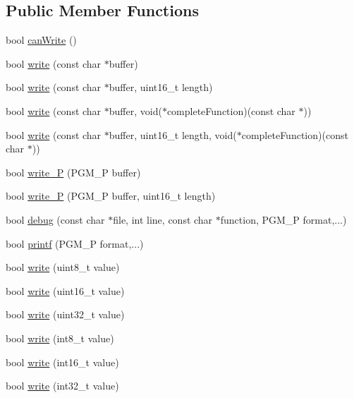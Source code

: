 \subsection*{\-Public \-Member \-Functions}
\begin{DoxyCompactItemize}
\item 
bool \hyperlink{class_m_h_v___device___t_x_a8fe33d10a27066c0f2e3f2339230692b}{can\-Write} ()
\item 
bool \hyperlink{class_m_h_v___device___t_x_ab24711b24c91592e0b86760820fd0d64}{write} (const char $\ast$buffer)
\item 
bool \hyperlink{class_m_h_v___device___t_x_a0f909191e9d73244be62d0b162f1567a}{write} (const char $\ast$buffer, uint16\-\_\-t length)
\item 
bool \hyperlink{class_m_h_v___device___t_x_a26a2e5e2c013300f9d870c8007980825}{write} (const char $\ast$buffer, void($\ast$complete\-Function)(const char $\ast$))
\item 
bool \hyperlink{class_m_h_v___device___t_x_ae723c03cb89924b25c150b9a48e444dc}{write} (const char $\ast$buffer, uint16\-\_\-t length, void($\ast$complete\-Function)(const char $\ast$))
\item 
bool \hyperlink{class_m_h_v___device___t_x_ae3385162a92a95687c2021fe222748f1}{write\-\_\-\-P} (\-P\-G\-M\-\_\-\-P buffer)
\item 
bool \hyperlink{class_m_h_v___device___t_x_a24a8e3b10463bc08579f8707abb25fbe}{write\-\_\-\-P} (\-P\-G\-M\-\_\-\-P buffer, uint16\-\_\-t length)
\item 
bool \hyperlink{class_m_h_v___device___t_x_a22f48a92047d5358ff2b48834aa8d3cf}{debug} (const char $\ast$file, int line, const char $\ast$function, \-P\-G\-M\-\_\-\-P format,...)
\item 
bool \hyperlink{class_m_h_v___device___t_x_a42c021c405f8f4b37db1a07a6853f8e8}{printf} (\-P\-G\-M\-\_\-\-P format,...)
\item 
bool \hyperlink{class_m_h_v___device___t_x_aad81a7d143bb26bab437a74569430c14}{write} (uint8\-\_\-t value)
\item 
bool \hyperlink{class_m_h_v___device___t_x_a2583c486a08d51847b167fd0a06d93f8}{write} (uint16\-\_\-t value)
\item 
bool \hyperlink{class_m_h_v___device___t_x_a985d3f2abde51de9c3fc634647830b03}{write} (uint32\-\_\-t value)
\item 
bool \hyperlink{class_m_h_v___device___t_x_a820eb384364698a2e96807d61be2da21}{write} (int8\-\_\-t value)
\item 
bool \hyperlink{class_m_h_v___device___t_x_ab893b0a7ca8811b05b60cf71a75c1af3}{write} (int16\-\_\-t value)
\item 
bool \hyperlink{class_m_h_v___device___t_x_abb8175f1eb385c08e154668957e3faf1}{write} (int32\-\_\-t value)
\end{DoxyCompactItemize}
